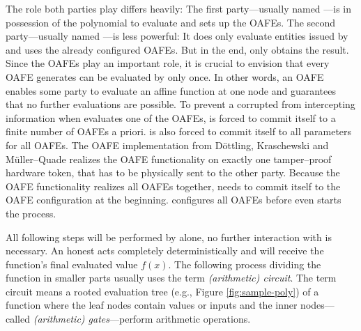 The role both parties play differs heavily: The first party---usually named
\JWpOne{}---is in possession of the polynomial to evaluate and sets up the
OAFEs.  The second party---usually named \JWpTwo{}---is less powerful: It does
only evaluate entities issued by \JWpOne{} and uses the already configured
OAFEs. But in the end, only \JWpTwo{} obtains the result.  Since the OAFEs play
an important role, it is crucial to envision that every OAFE \JWpOne{} generates
can be evaluated by \JWpTwo{} only once. In other words, an OAFE enables some
party to evaluate an affine function at one node and guarantees that no further
evaluations are possible. To prevent a corrupted \JWpOne{} from intercepting
information when \JWpTwo{} evaluates one of the OAFEs, \JWpOne{} is forced to
commit itself to a finite number of OAFEs a priori. \JWpOne{} is also forced to
commit itself to all parameters for all OAFEs. The OAFE implementation from
Döttling, Kraschewski and Müller--Quade \cite{davidgoliath} realizes the OAFE
functionality on exactly one tamper--proof hardware token, that has to be
physically sent to the other party. Because the OAFE functionality realizes all
OAFEs together, \JWpOne{} needs to commit itself to the OAFE configuration at
the beginning. \JWpOne{} configures all OAFEs before \JWpTwo{} even starts the
process.

All following steps will be performed by \JWpTwo{} alone, no further interaction
with \JWpOne{} is necessary. An honest \JWpTwo{} acts completely
deterministically and will receive the function's final evaluated value $f(x)$.
The following process dividing the function in smaller parts usually uses the
term \emph{(arithmetic) circuit}. The term circuit means a rooted evaluation
tree (e.g., Figure \ref{fig:sample-poly}) of a function where the leaf nodes
contain values or inputs and the inner nodes---called \emph{(arithmetic)
gates}---perform arithmetic operations.

